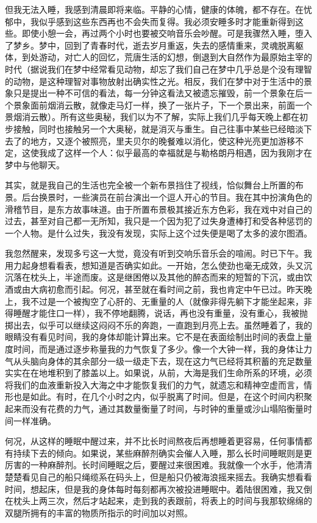 \par 但我无法入睡，我感到清晨即将来临。平静的心情，健康的体魄，都不存在。在忧郁中，我似乎感到这些东西再也不会失而复得。我必须安睡多时才能重新得到这些。即使小憩一会，再过两个小时也要被交响音乐会吵醒。可是我骤然入睡，堕入了梦乡。梦中，回到了青春时代，逝去岁月重返，失去的感情重来，灵魂脱离躯体，到处游动，对亡人的回忆，荒唐生活的幻想，倒退到大自然作为最原始主宰的时代（据说我们在梦中经常看见动物，却忘了我们自己在梦中几乎总是个没有理智的动物，是这种理智对事物放射出确实性之光。相反，我们在梦中对于生活中的景象只是提出一种不可信的看法，每一分钟这看法又被遗忘摧毁，前一个景象在后一个景象面前烟消云散，就像走马灯一样，换了一张片子，下一个景出来，前面一个景烟消云散）。所有这些奥秘，我们以为不了解，实际上我们几乎每天晚上都在初步接触，同时也接触另一个大奥秘，就是消灭与重生。自己往事中某些已经暗淡下去了的地方，又逐个被照亮，里夫贝尔的晚餐难以消化，使这种光亮更加游移不定，这使我成了这样一个人：似乎最高的幸福就是与勒格朗丹相遇，因为我刚才在梦中与他聊天。
\par 其实，就是我自己的生活也完全被一个新布景挡住了视线，恰似舞台上所置的布景。后台换景时，一些演员在前台演出一个逗人开心的节目。我在其中扮演角色的滑稽节目，是东方故事味道。由于所置布景极其接近东方色彩，我在戏中对自己的过去，甚至对自己都一无所知，我只是一个因为犯了过失身遭棒打和受各种惩罚的一个人物。是什么过失，我没有发现，实际上这个过失便是喝了太多的波尔图酒。
\par 我忽然醒来，发现多亏这一大觉，竟没有听到交响乐音乐会的喧闹。时已下午。我用力起身想看看表，想知道是否确实如此。一开始，怎么使劲也毫无成效，头又沉沉落在枕头上，半途而废。这是继困倦以及其他的醉态而来的短暂的下沉，或由饮酒或由大病初愈而引起。何况，甚至就在看时间之前，我也肯定中午已过。昨天晚上，我不过是一个被掏空了心肝的、无重量的人（就像非得先躺下才能坐起来，非得睡醒才能住口一样），我不停地翻腾，说话，再也没有重量，没有重心，我被抛掷出去，似乎可以继续这闷闷不乐的奔跑，一直跑到月亮上去。虽然睡着了，我的眼睛没有看见时间，我的身体却能计算出来。它不是在表面绘制出时间的表盘上量度时间，而是通过逐步称量我的力气恢复了多少。像一个大钟一样，我的身体让力气从头脑向身体的其余部分一级一级走下去，现在这力气已经将其积蓄的充足数量实实在在地堆积到了膝盖以上。如果说，从前，大海是我们生命所系的环境，必须将我们的血液重新投入大海之中才能恢复我们的力气，就遗忘和精神空虚而言，情形也是如此。有时，在几个小时之内，似乎脱离了时间。但是，在这个时间内积聚起来而没有花费的力气，通过其数量衡量了时间，与时钟的重量或沙山塌陷衡量时间一样准确。
\par 何况，从这样的睡眠中醒过来，并不比长时间熬夜后再想睡着更容易，任何事情都有持续下去的倾向。如果说，某些麻醉剂确实会催人入睡，那么长时间睡眠则是更厉害的一种麻醉剂。长时间睡眠之后，要醒过来很困难。我就像一个水手，他清清楚楚看见自己的船只绳缆系在码头上，但是船只仍被海浪摇来摇去。我确实想看看时间，想起床，但是我的身体每时每刻都再次被投进睡眠中。着陆很困难，我又倒在枕头上两三次，然后才站起来，走到我的表跟前，将表上的时间与我那软绵绵的双腿所拥有的丰富的物质所指示的时间加以对照。
